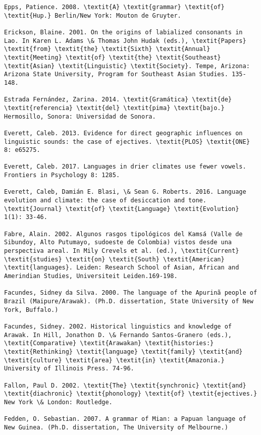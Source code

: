 \begin{verbatim}
Epps, Patience. 2008. \textit{A} \textit{grammar} \textit{of} \textit{Hup.} Berlin/New York: Mouton de Gruyter.

Erickson, Blaine. 2001. On the origins of labialized consonants in Lao. In Karen L. Adams \& Thomas John Hudak (eds.), \textit{Papers} \textit{from} \textit{the} \textit{Sixth} \textit{Annual} \textit{Meeting} \textit{of} \textit{the} \textit{Southeast} \textit{Asian} \textit{Linguistic} \textit{Society}. Tempe, Arizona: Arizona State University, Program for Southeast Asian Studies. 135-148.

Estrada Fernández, Zarina. 2014. \textit{Gramática} \textit{de} \textit{referencia} \textit{del} \textit{pima} \textit{bajo.} Hermosillo, Sonora: Universidad de Sonora.

Everett, Caleb. 2013. Evidence for direct geographic influences on linguistic sounds: the case of ejectives. \textit{PLOS} \textit{ONE} 8: e65275.

Everett, Caleb. 2017. Languages in drier climates use fewer vowels. Frontiers in Psychology 8: 1285.

Everett, Caleb, Damián E. Blasi, \& Sean G. Roberts. 2016. Language evolution and climate: the case of desiccation and tone. \textit{Journal} \textit{of} \textit{Language} \textit{Evolution} 1(1): 33-46.

Fabre, Alain. 2002. Algunos rasgos tipológicos del Kamsá (Valle de Sibundoy, Alto Putumayo, sudoeste de Colombia) vistos desde una perspectiva areal. In Mily Crevels et al. (ed.), \textit{Current} \textit{studies} \textit{on} \textit{South} \textit{American} \textit{languages}. Leiden: Research School of Asian, African and Amerindian Studies, Universiteit Leiden.169-198.

Facundes, Sidney da Silva. 2000. The language of the Apurinã people of Brazil (Maipure/Arawak). (Ph.D. dissertation, State University of New York, Buffalo.)

Facundes, Sidney. 2002. Historical linguistics and knowledge of Arawak. In Hill, Jonathon D. \& Fernando Santos-Granero (eds.), \textit{Comparative} \textit{Arawakan} \textit{histories:} \textit{Rethinking} \textit{language} \textit{family} \textit{and} \textit{culture} \textit{area} \textit{in} \textit{Amazonia.} University of Illinois Press. 74-96.

Fallon, Paul D. 2002. \textit{The} \textit{synchronic} \textit{and} \textit{diachronic} \textit{phonology} \textit{of} \textit{ejectives.} New York \& London: Routledge.

Fedden, O. Sebastian. 2007. A grammar of Mian: a Papuan language of New Guinea. (Ph.D. dissertation, The University of Melbourne.)


\end{verbatim}
